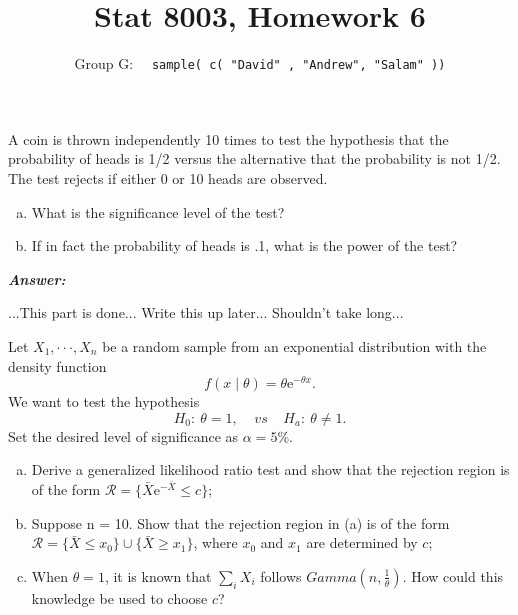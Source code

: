 \documentclass[12pt]{article}
\newenvironment{question}[2][Question]{\begin{trivlist}
\item[\hskip \labelsep {\bfseries #1}\hskip \labelsep {\bfseries #2.}]}{\end{trivlist}}
\begin{document}
 \renewcommand{\arraystretch}{1.3}

 
\title{Stat 8003, Homework 6}%
\author{Group G: \ \ \texttt{sample( c( "David" , "Andrew",  "Salam" ))}
\\ %
} %
 
\maketitle
 
 \begin{question}{6.1}  A coin is thrown independently 10 times to test the hypothesis that the probability of heads is
1/2 versus the alternative that the probability is not 1/2. The test rejects if either 0 or 10 heads
are observed.

\begin{enumerate}[(a)]
\item What is the significance level of the test?
\item If in fact the probability of heads is .1, what is the power of the test?
\end{enumerate}

\end{question} 


  \textbf{\color{TealBlue}\emph{Answer:} } 
   
...This part is done... Write this up later... Shouldn't take long... 

\bigskip
\bigskip
 \begin{question}{6.2}  Let $X_1, · · · ,X_n$ be a random sample from an exponential distribution with the density function
$$
f(x \mid \theta) = \theta \mathrm{e}^{-\theta x}.
$$
We want to test the hypothesis
$$
H_0: \ \theta = 1, \; \; \; \; vs  \; \; \; \; H_a: \ \theta \neq 1.
$$
Set the desired level of significance as $\alpha = 5\%$.

\begin{enumerate}[(a)]
\item Derive a generalized likelihood ratio test and show that the rejection region is of the form $\mathcal{R} = \{\bar X \mathrm{e}^{-\bar X} \leq c\}$;
\item Suppose n = 10. Show that the rejection region in (a) is of the form $\mathcal{R} = \{\bar X \leq x_0 \} \cup \{\bar X \geq x_1 \}$, where $x_0$ and $x_1$ are determined by $c$;
\item When $\theta = 1$, it is known that $\sum_i X_i$ follows $Gamma(n, \frac{1}{\theta})$. How could this knowledge be
used to choose $c$?
\end{enumerate}

\end{question} 
\end{document}
